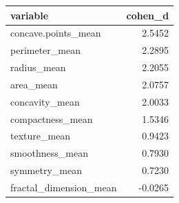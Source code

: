 \begin{tabular}{lr}
\toprule
variable & cohen\_d \\
\midrule
concave.points\_mean & 2.5452 \\
perimeter\_mean & 2.2895 \\
radius\_mean & 2.2055 \\
area\_mean & 2.0757 \\
concavity\_mean & 2.0033 \\
compactness\_mean & 1.5346 \\
texture\_mean & 0.9423 \\
smoothness\_mean & 0.7930 \\
symmetry\_mean & 0.7230 \\
fractal\_dimension\_mean & -0.0265 \\
\bottomrule
\end{tabular}
